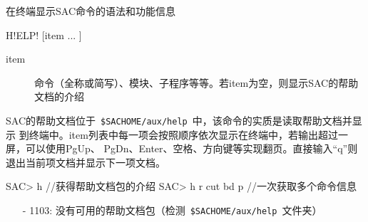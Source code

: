 \label{cmd:help}

在终端显示SAC命令的语法和功能信息

\begin{SACSTX}
H!ELP! [item ... ]
\end{SACSTX}

\begin{description}
\item [item] 命令（全称或简写）、模块、子程序等等。若item为空，则显示SAC的帮助文档的介绍
\end{description}

SAC的帮助文档位于~\lstinline{$SACHOME/aux/help}~中，该命令的实质是读取帮助文档并显示
到终端中。item列表中每一项会按照顺序依次显示在终端中，若输出超过一屏，可以使用PgUp、
PgDn、Enter、空格、方向键等实现翻页。直接输入``q''则退出当前项文档并显示下一项文档。

\begin{SACCode}
SAC> h                  //获得帮助文档包的介绍
SAC> h r cut bd p       //一次获取多个命令信息
\end{SACCode}

\begin{itemize}
\item[-]1103: 没有可用的帮助文档包（检测~\lstinline{$SACHOME/aux/help}~文件夹）
\end{itemize}
